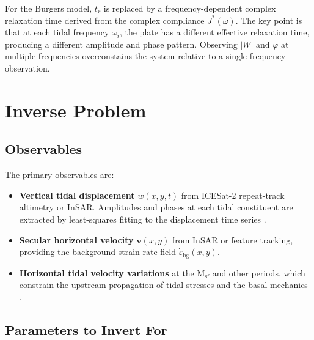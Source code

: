 \documentclass[11pt,letterpaper]{article}
\begin{document}
For the Burgers model, $t_r$ is replaced by a frequency-dependent complex relaxation time derived from the complex compliance $J^*(\omega)$.  The key point is that at each tidal frequency $\omega_i$, the plate has a different effective relaxation time, producing a different amplitude and phase pattern.  Observing $|W|$ and $\varphi$ at multiple frequencies overconstains the system relative to a single-frequency observation.

\section{Inverse Problem}
\label{sec:inverse}

\subsection{Observables}
\label{sec:observables}

The primary observables are:
\begin{itemize}
  \item \textbf{Vertical tidal displacement} $w(x,y,t)$ from ICESat-2 repeat-track altimetry or InSAR.  Amplitudes and phases at each tidal constituent are extracted by least-squares fitting to the displacement time series \citep{Minchew2017}.
  \item \textbf{Secular horizontal velocity} $\bm{v}(x,y)$ from InSAR or feature tracking, providing the background strain-rate field $\dot{\varepsilon}_{\text{bg}}(x,y)$.
  \item \textbf{Horizontal tidal velocity variations} at the M$_{\text{sf}}$ and other periods, which constrain the upstream propagation of tidal stresses and the basal mechanics \citep{Minchew2017,Gudmundsson2006,Rosier2014}.
\end{itemize}

\subsection{Parameters to Invert For}
\label{sec:parameters}
\end{document}
